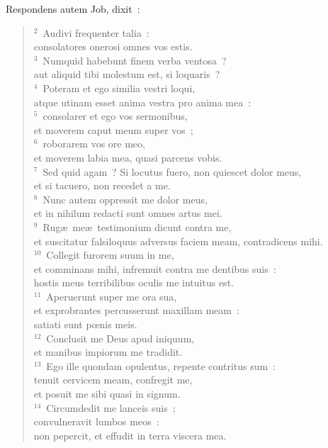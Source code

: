 \lettrine[lines=10,image=true,loversize=0.05,lraise=-0.03]{R}{}espondens autem Job, dixit~:
\begin{flushleft}\begin{verse}\vspace{6pt}${}^{2}$~Audivi frequenter talia~:\\ consolatores onerosi omnes vos estis.\\
${}^{3}$~Numquid habebunt finem verba ventosa~?\\ aut aliquid tibi molestum est, si loquaris~?\\
${}^{4}$~Poteram et ego similia vestri loqui,\\ atque utinam esset anima vestra pro anima mea~:\\
${}^{5}$~consolarer et ego vos sermonibus,\\ et moverem caput meum super vos~;\\
${}^{6}$~roborarem vos ore meo,\\ et moverem labia mea, quasi parcens vobis.\\
${}^{7}$~Sed quid agam~? Si locutus fuero, non quiescet dolor meus,\\ et si tacuero, non recedet a me.\\
${}^{8}$~Nunc autem oppressit me dolor meus,\\ et in nihilum redacti sunt omnes artus mei.\\
${}^{9}$~Rug\ae\ me\ae\ testimonium dicunt contra me,\\ et suscitatur falsiloquus adversus faciem meam, contradicens mihi.\\
${}^{10}$~Collegit furorem suum in me,\\ et comminans mihi, infremuit contra me dentibus suis~:\\ hostis meus terribilibus oculis me intuitus est.\\
${}^{11}$~Aperuerunt super me ora sua,\\ et exprobrantes percusserunt maxillam meam~:\\ satiati sunt pœnis meis.\\
${}^{12}$~Conclusit me Deus apud iniquum,\\ et manibus impiorum me tradidit.\\
${}^{13}$~Ego ille quondam opulentus, repente contritus sum~:\\ tenuit cervicem meam, confregit me,\\ et posuit me sibi quasi in signum.\\
${}^{14}$~Circumdedit me lanceis suis~;\\ convulneravit lumbos meos~:\\ non pepercit, et effudit in terra viscera mea.\\

\end{verse}
\end{flushleft}
